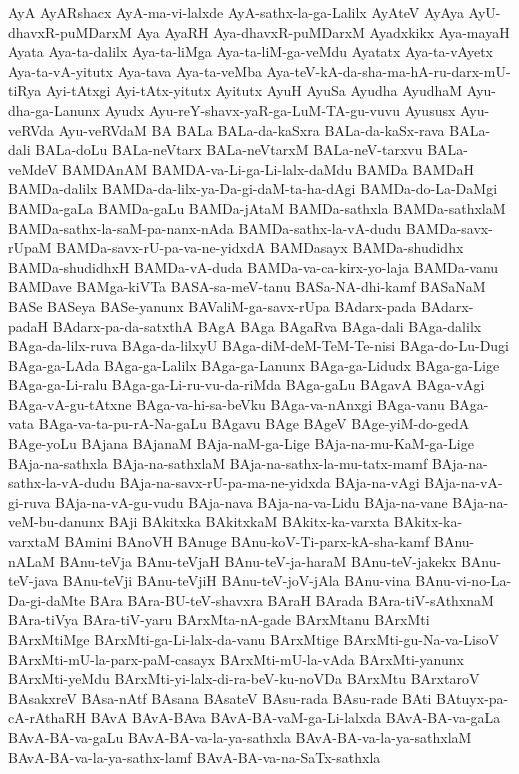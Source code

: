{AyA
AyARshacx
AyA-ma-vi-lalxde
AyA-sathx-la-ga-Lalilx
AyAteV
AyAya
AyU-dhavxR-puMDarxM
Aya
AyaRH
Aya-dhavxR-puMDarxM
Ayadxkikx
Aya-mayaH
Ayata
Aya-ta-dalilx
Aya-ta-liMga
Aya-ta-liM-ga-veMdu
Ayatatx
Aya-ta-vAyetx
Aya-ta-vA-yitutx
Aya-tava
Aya-ta-veMba
Aya-teV-kA-da-sha-ma-hA-ru-darx-mU-tiRya
Ayi-tAtxgi
Ayi-tAtx-yitutx
Ayitutx
AyuH
AyuSa
Ayudha
AyudhaM
Ayu-dha-ga-Lanunx
Ayudx
Ayu-reY-shavx-yaR-ga-LuM-TA-gu-vuvu
Ayususx
Ayu-veRVda
Ayu-veRVdaM
BA
BALa
BALa-da-kaSxra
BALa-da-kaSx-rava
BALa-dali
BALa-doLu
BALa-neVtarx
BALa-neVtarxM
BALa-neV-tarxvu
BALa-veMdeV
BAMDAnAM
BAMDA-va-Li-ga-Li-lalx-daMdu
BAMDa
BAMDaH
BAMDa-dalilx
BAMDa-da-lilx-ya-Da-gi-daM-ta-ha-dAgi
BAMDa-do-La-DaMgi
BAMDa-gaLa
BAMDa-gaLu
BAMDa-jAtaM
BAMDa-sathxla
BAMDa-sathxlaM
BAMDa-sathx-la-saM-pa-nanx-nAda
BAMDa-sathx-la-vA-dudu
BAMDa-savx-rUpaM
BAMDa-savx-rU-pa-va-ne-yidxdA
BAMDasayx
BAMDa-shudidhx
BAMDa-shudidhxH
BAMDa-vA-duda
BAMDa-va-ca-kirx-yo-laja
BAMDa-vanu
BAMDave
BAMga-kiVTa
BASA-sa-meV-tanu
BASa-NA-dhi-kamf
BASaNaM
BASe
BASeya
BASe-yanunx
BAValiM-ga-savx-rUpa
BAdarx-pada
BAdarx-padaH
BAdarx-pa-da-satxthA
BAgA
BAga
BAgaRva
BAga-dali
BAga-dalilx
BAga-da-lilx-ruva
BAga-da-lilxyU
BAga-diM-deM-TeM-Te-nisi
BAga-do-Lu-Dugi
BAga-ga-LAda
BAga-ga-Lalilx
BAga-ga-Lanunx
BAga-ga-Lidudx
BAga-ga-Lige
BAga-ga-Li-ralu
BAga-ga-Li-ru-vu-da-riMda
BAga-gaLu
BAgavA
BAga-vAgi
BAga-vA-gu-tAtxne
BAga-va-hi-sa-beVku
BAga-va-nAnxgi
BAga-vanu
BAga-vata
BAga-va-ta-pu-rA-Na-gaLu
BAgavu
BAge
BAgeV
BAge-yiM-do-gedA
BAge-yoLu
BAjana
BAjanaM
BAja-naM-ga-Lige
BAja-na-mu-KaM-ga-Lige
BAja-na-sathxla
BAja-na-sathxlaM
BAja-na-sathx-la-mu-tatx-mamf
BAja-na-sathx-la-vA-dudu
BAja-na-savx-rU-pa-ma-ne-yidxda
BAja-na-vAgi
BAja-na-vA-gi-ruva
BAja-na-vA-gu-vudu
BAja-nava
BAja-na-va-Lidu
BAja-na-vane
BAja-na-veM-bu-danunx
BAji
BAkitxka
BAkitxkaM
BAkitx-ka-varxta
BAkitx-ka-varxtaM
BAmini
BAnoVH
BAnuge
BAnu-koV-Ti-parx-kA-sha-kamf
BAnu-nALaM
BAnu-teVja
BAnu-teVjaH
BAnu-teV-ja-haraM
BAnu-teV-jakekx
BAnu-teV-java
BAnu-teVji
BAnu-teVjiH
BAnu-teV-joV-jAla
BAnu-vina
BAnu-vi-no-La-Da-gi-daMte
BAra
BAra-BU-teV-shavxra
BAraH
BArada
BAra-tiV-sAthxnaM
BAra-tiVya
BAra-tiV-yaru
BArxMta-nA-gade
BArxMtanu
BArxMti
BArxMtiMge
BArxMti-ga-Li-lalx-da-vanu
BArxMtige
BArxMti-gu-Na-va-LisoV
BArxMti-mU-la-parx-paM-casayx
BArxMti-mU-la-vAda
BArxMti-yanunx
BArxMti-yeMdu
BArxMti-yi-lalx-di-ra-beV-ku-noVDa
BArxMtu
BArxtaroV
BAsakxreV
BAsa-nAtf
BAsana
BAsateV
BAsu-rada
BAsu-rade
BAti
BAtuyx-pa-cA-rAthaRH
BAvA
BAvA-BAva
BAvA-BA-vaM-ga-Li-lalxda
BAvA-BA-va-gaLa
BAvA-BA-va-gaLu
BAvA-BA-va-la-ya-sathxla
BAvA-BA-va-la-ya-sathxlaM
BAvA-BA-va-la-ya-sathx-lamf
BAvA-BA-va-na-SaTx-sathxla
}
